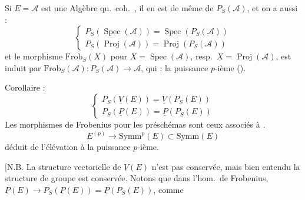 \documentclass[11pt,a4paper]{article}
\begin{document}

Si $E = \mathcal{A}$ est une Algèbre qu.\ coh.\ , il en est de même de $P_S(\mathcal{A})$, et on a aussi :
\[
  \begin{cases}
    P_S(\operatorname{Spec}(\mathcal{A})) = \operatorname{Spec}(P_S(\mathcal{A})) \\
    P_S(\operatorname{Proj}(\mathcal{A})) = \operatorname{Proj}(P_S(\mathcal{A}))
  \end{cases}
\]
et le morphisme $\mathrm{Frob}_S(X)$ pour $X = \operatorname{Spec}(\mathcal{A})$,
resp.\ $X = \operatorname{Proj}(\mathcal{A})$, est induit par
$\mathrm{Frob}_S(\mathcal{A}) : P_S(\mathcal{A}) \to \mathcal{A}$, qui
\uncertain{est} : la puissance $p$-ième (\ill{}).



Corollaire :
\[
  \begin{cases}
    P_S(\underline{V}(E)) = \underline{V}(P_S(E)) \\
    P_S(\underline{P}(E)) = \underline{P}(P_S(E))
  \end{cases}
\]
Les morphismes de Frobenius pour les préschémas sont ceux associés à
\struck{$P_S(E)$} \struck{$\mathrm{Frob}_S(E)$~:}
.
\struck{\ill{} \ill{} \ill{}} 
\[
  E^{(p)} \longrightarrow \mathrm{Symm}^{p}(E) \subset \mathrm{Symm}(E)
\]
déduit de l'élévation à la puissance $p$-ième.

[N.B. La structure vectorielle de $\underline{V}(E)$ n'est pas
conservée, mais bien entendu la structure de groupe est
conservée. Notons que dans l'hom.\ de Frobenius,
$\underline{P}(E) \to P_S(\underline{P}(E)) = \underline{P}(P_S(E))$, comme

\end{document}
